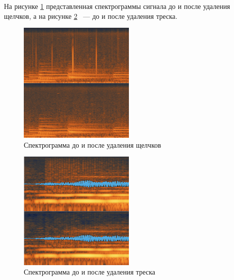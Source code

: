 \documentclass[oneside, final, 14pt]{extreport}
\begin{document}
На рисунке \ref{pic-rx3declick-01} представленная спектрограммы сигнала до и после удаления щелчков, а на рисунке \ref{pic-rx3declick-02} ~--- до и после удаления треска.

\begin{figure}[ht!]
\centering
\includegraphics[width=0.5\textwidth]{pic-rx3declick-01}
\caption{Спектрограмма до и после удаления щелчков}
\label{pic-rx3declick-01}
\end{figure}

\begin{figure}[ht!]
\centering
\includegraphics[width=0.5\textwidth]{pic-rx3declick-02}
\caption{Спектрограмма до и после удаления треска}
\label{pic-rx3declick-02}
\end{figure}
\end{document}
